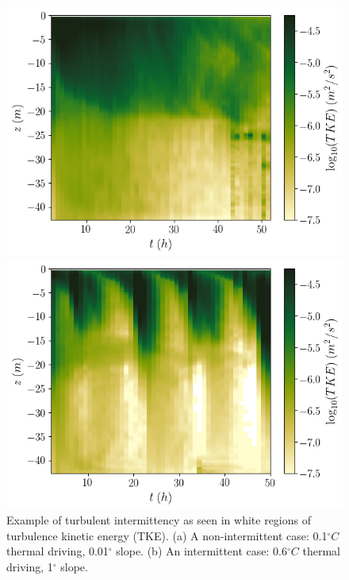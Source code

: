 \documentclass[draft]{agujournal2019}
\begin{document}
\begin{figure}[h!]
    \centering
    \begin{minipage}{0.4\textwidth}
        \includegraphics[trim={0 0cm 3cm 0cm},clip,width=\textwidth]{Figures/dslope2/e_hovmoller.png}
    \end{minipage}%
    \begin{minipage}{0.5\textwidth}
        \includegraphics[trim={0 0cm 0 0cm},clip,width=\textwidth]{Figures/dT4/e_hovmoller.png}
    \end{minipage}
    \caption{Example of turbulent intermittency as seen in white regions of turbulence kinetic energy (TKE). (a) A non-intermittent case: 0.1$^{\circ}C$ thermal driving, 0.01$^{\circ}$ slope. (b) An intermittent case: 0.6$^{\circ}C$ thermal driving, 1$^{\circ}$ slope.}
    \label{fig:intermittency}
\end{figure}
\end{document}
